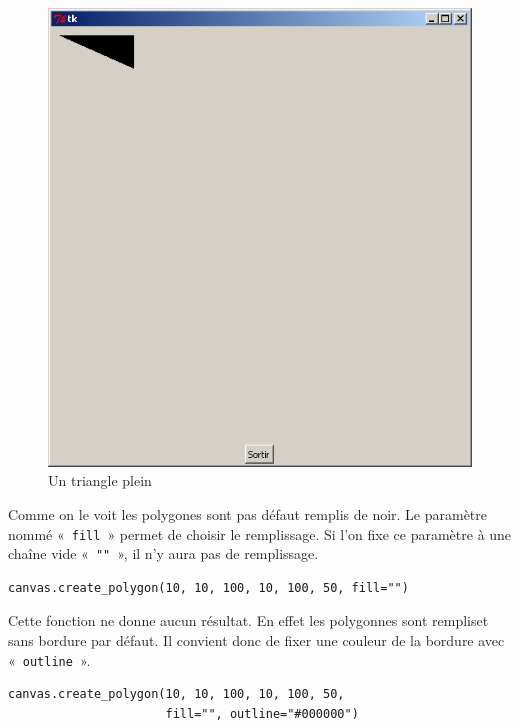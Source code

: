 \begin{figure}[h!]
\centering
\includegraphics[scale=0.4]{images/triangle}
\caption{Un triangle plein}\label{fig:triangle}
\end{figure}

Comme on le voit les polygones sont pas défaut remplis de noir. Le paramètre nommé «~\texttt{fill}~» permet de choisir le remplissage. Si l'on fixe ce paramètre à une chaîne vide «~\texttt{""}~», il n'y aura pas de remplissage.

\begin{Verbatim}[frame=single,rulecolor=\color{mbleu}, label=à taper]
canvas.create_polygon(10, 10, 100, 10, 100, 50, fill="")
\end{Verbatim}

Cette fonction ne donne aucun résultat. En effet les polygonnes sont rempliset sans bordure par défaut. Il convient donc de fixer une couleur de la bordure avec «~\texttt{outline}~».

\begin{Verbatim}[frame=single,rulecolor=\color{mbleu}, label=à taper]
canvas.create_polygon(10, 10, 100, 10, 100, 50, 
                      fill="", outline="#000000")
\end{Verbatim}

